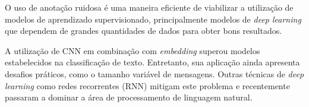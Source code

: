 O uso de anotação ruidosa é uma maneira eficiente de viabilizar a utilização de modelos de aprendizado supervisionado,
principalmente modelos de \textit{deep learning} que dependem de grandes quantidades de dados para obter bons resultados.

A utilização de CNN em combinação com \textit{embedding} superou modelos estabelecidos na classificação de texto.
Entretanto, sua aplicação ainda apresenta desafios práticos, como o tamanho variável de mensagens.
Outras técnicas de \textit{deep learning} como redes recorrentes (RNN) mitigam este problema e recentemente passaram a
dominar a área de processamento de linguagem natural.
